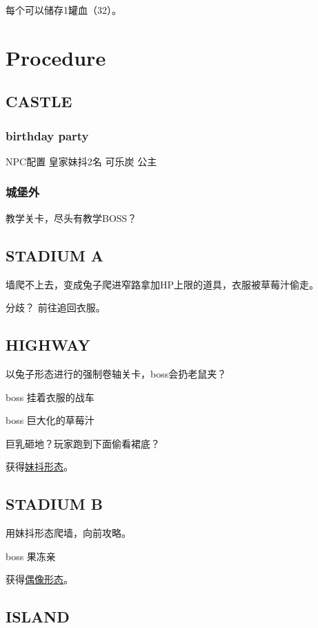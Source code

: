\documentclass{article}
\begin{document}
每个可以储存1罐血（32）。

\section{Procedure}

\subsection{CASTLE}

\subsubsection{birthday party}

NPC配置 皇家妹抖2名 可乐炭 公主

\subsubsection{城堡外}

教学关卡，尽头有教学BOSS？

\subsection{STADIUM A}

墙爬不上去，变成兔子爬进窄路拿加HP上限的道具，衣服被草莓汁偷走。

分歧？ 前往追回衣服。

\subsection{HIGHWAY}

以兔子形态进行的强制卷轴关卡，boss会扔老鼠夹？

boss 挂着衣服的战车

boss 巨大化的草莓汁

巨乳砸地？玩家跑到下面偷看裙底？

获得\hyperref[costume_maid]{妹抖形态}。

\subsection{STADIUM B}

用妹抖形态爬墙，向前攻略。

boss 果冻亲

获得\hyperref[costume_idol]{偶像形态}。

\subsection{ISLAND}
\end{document}
